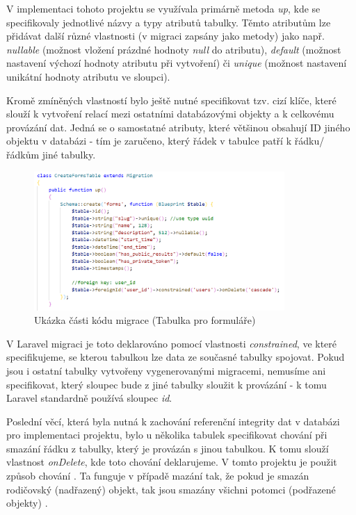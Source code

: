 	V implementaci tohoto projektu se využívala primárně metoda \textit{up}, kde se specifikovaly jednotlivé názvy a typy atributů tabulky. Těmto atributům lze přidávat další různé vlastnosti (v migraci zapsány jako metody) jako např. \textit{nullable} (možnost vložení prázdné hodnoty \textit{null} do atributu), \textit{default} (možnost nastavení výchozí hodnoty atributu při vytvoření) či \textit{unique} (možnost nastavení unikátní hodnoty atributu ve sloupci).
	
	Kromě zmíněných vlastností bylo ještě nutné specifikovat tzv. cizí klíče, které slouží k vytvoření relací mezi ostatními databázovými objekty a k celkovému provázání dat. Jedná se o samostatné atributy, které většinou obsahují ID jiného objektu v databázi - tím je zaručeno, který řádek v tabulce patří k řádku/řádkům jiné tabulky. 
	
	 \begin{figure}[h]
		\centering
		\includegraphics[width=0.85\textwidth]{img/migrace.png}
		\caption{Ukázka části kódu migrace (Tabulka pro formuláře)}
		\label{fig:migrace}
	\end{figure}
	
	V Laravel migraci je toto deklarováno pomocí vlastnosti \textit{constrained}, ve které specifikujeme, se kterou tabulkou lze data ze současné tabulky spojovat. Pokud jsou i ostatní tabulky vytvořeny vygenerovanými migracemi, nemusíme ani specifikovat, který sloupec bude z jiné tabulky sloužit k provázání - k tomu Laravel standardně používá sloupec \textit{id}.
	
	Poslední věcí, která byla nutná k zachování referenční integrity dat v databázi pro implementaci projektu, bylo u několika tabulek specifikovat chování při smazání řádku z tabulky, který je provázán s jinou tabulkou. K tomu slouží vlastnost \textit{onDelete}, kde toto chování deklarujeme. V tomto projektu je použit způsob chování . Ta funguje v případě mazání tak, že pokud je smazán rodičovský (nadřazený) objekt, tak jsou smazány všichni potomci (podřazené objekty) \cite{CascadeDel}.
		
